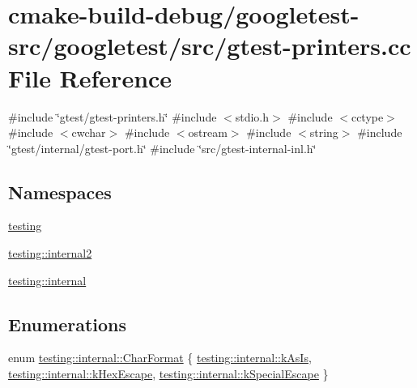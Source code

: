 \hypertarget{gtest-printers_8cc}{}\section{cmake-\/build-\/debug/googletest-\/src/googletest/src/gtest-\/printers.cc File Reference}
\label{gtest-printers_8cc}
{\ttfamily \#include \char`\"{}gtest/gtest-\/printers.\+h\char`\"{}}\newline
{\ttfamily \#include $<$stdio.\+h$>$}\newline
{\ttfamily \#include $<$cctype$>$}\newline
{\ttfamily \#include $<$cwchar$>$}\newline
{\ttfamily \#include $<$ostream$>$}\newline
{\ttfamily \#include $<$string$>$}\newline
{\ttfamily \#include \char`\"{}gtest/internal/gtest-\/port.\+h\char`\"{}}\newline
{\ttfamily \#include \char`\"{}src/gtest-\/internal-\/inl.\+h\char`\"{}}\newline
\subsection*{Namespaces}
\begin{DoxyCompactItemize}
\item 
 \mbox{\hyperlink{namespacetesting}{testing}}
\item 
 \mbox{\hyperlink{namespacetesting_1_1internal2}{testing\+::internal2}}
\item 
 \mbox{\hyperlink{namespacetesting_1_1internal}{testing\+::internal}}
\end{DoxyCompactItemize}
\subsection*{Enumerations}
\begin{DoxyCompactItemize}
\item 
enum \mbox{\hyperlink{namespacetesting_1_1internal_ae2ef98247c76a50cdc80ceb4a6c81793}{testing\+::internal\+::\+Char\+Format}} \{ \mbox{\hyperlink{namespacetesting_1_1internal_ae2ef98247c76a50cdc80ceb4a6c81793af7038866be92e9978360b831e376ffaa}{testing\+::internal\+::k\+As\+Is}}, 
\mbox{\hyperlink{namespacetesting_1_1internal_ae2ef98247c76a50cdc80ceb4a6c81793aebfa5293302338a8e8678744c103f113}{testing\+::internal\+::k\+Hex\+Escape}}, 
\mbox{\hyperlink{namespacetesting_1_1internal_ae2ef98247c76a50cdc80ceb4a6c81793ae1211108e9f35f891d9951da64794d03}{testing\+::internal\+::k\+Special\+Escape}}
 \}
\end{DoxyCompactItemize}
